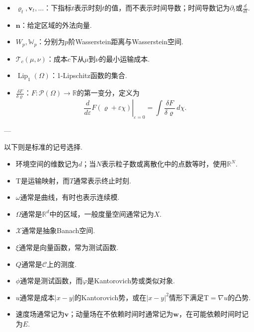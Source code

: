 \begin{itemize}
\item $\varrho_t,\mathbf v_t,\ldots$：下指标$t$表示时刻$t$的值，而不表示时间导数；时间导数记为$\partial_t$或$\frac d{dt}$.
\item $\mathbf n$：给定区域的外法向量.
\item $W_p,\mathbb W_p$：分别为$p$阶Wasserstein距离与Wasserstein空间.
\item $\mathscr T_c(\mu,\nu)$：成本$c$下从$\mu$到$\nu$的最小运输成本.
\item $\operatorname{Lip}_1(\Omega)$：1-Lipschitz函数的集合.
\item $\frac{\delta F}{\delta\varrho}$：$F:\mathscr P(\Omega)\to\mathbb R$的第一变分，定义为
\[
\left.\frac d{d\varepsilon}F(\varrho+\varepsilon\chi)\right|_{\varepsilon=0}
=\int\frac{\delta F}{\delta\varrho}\,d\chi.
\]
\end{itemize}
\begin{center}---\end{center}
以下则是标准的记号选择.
\begin{itemize}
\item 环境空间的维数记为$d$；当$N$表示粒子数或离散化中的点数等时，使用$\mathbb R^N$.
\item $\mathrm T$是运输映射，而$T$通常表示终止时刻.
\item $\omega$通常是曲线，有时也表示连续模.
\item $\Omega$通常是$\mathbb R^d$中的区域，一般度量空间通常记为$X$.
\item $\mathscr X$通常是抽象Banach空间.
\item $\xi$通常是向量函数，常为测试函数.
\item $Q$通常是$\mathscr C$上的测度.
\item $\phi$通常是测试函数，而$\varphi$是Kantorovich势或类似对象.
\item $u$通常是成本$|x-y|$的Kantorovich势，或在$|x-y|^2$情形下满足$\mathrm T=\nabla u$的凸势.
\item 速度场通常记为$\mathbf v$；动量场在不依赖时间时通常记为$\mathbf w$，在可能依赖时间时记为$E$.
\end{itemize}
